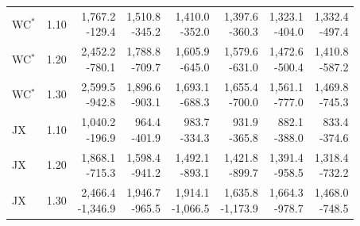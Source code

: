 \begin{table}[htbp]
\begin{minipage}{.95\textwidth}
\begin{tabular*}{\linewidth}{@{\extracolsep{\fill}}llrrrrrr@{}}
WC$^{*}$ & 1.10 & \shortstack{1,767.2\\-129.4} & \shortstack{1,510.8\\-345.2} & \shortstack{1,410.0\\-352.0} & \shortstack{1,397.6\\-360.3} & \shortstack{1,323.1\\-404.0} & \shortstack{1,332.4\\-497.4} \\
WC$^{*}$ & 1.20 & \shortstack{2,452.2\\-780.1} & \shortstack{1,788.8\\-709.7} & \shortstack{1,605.9\\-645.0} & \shortstack{1,579.6\\-631.0} & \shortstack{1,472.6\\-500.4} & \shortstack{1,410.8\\-587.2} \\
WC$^{*}$ & 1.30 & \shortstack{2,599.5\\-942.8} & \shortstack{1,896.6\\-903.1} & \shortstack{1,693.1\\-688.3} & \shortstack{1,655.4\\-700.0} & \shortstack{1,561.1\\-777.0} & \shortstack{1,469.8\\-745.3} \\
JX & 1.10 & \shortstack{1,040.2\\-196.9} & \shortstack{964.4\\-401.9} & \shortstack{983.7\\-334.3} & \shortstack{931.9\\-365.8} & \shortstack{882.1\\-388.0} & \shortstack{833.4\\-374.6} \\
JX & 1.20 & \shortstack{1,868.1\\-715.3} & \shortstack{1,598.4\\-941.2} & \shortstack{1,492.1\\-893.1} & \shortstack{1,421.8\\-899.7} & \shortstack{1,391.4\\-958.5} & \shortstack{1,318.4\\-732.2} \\
JX & 1.30 & \shortstack{2,466.4\\-1,346.9} & \shortstack{1,946.7\\-965.5} & \shortstack{1,914.1\\-1,066.5} & \shortstack{1,635.8\\-1,173.9} & \shortstack{1,664.3\\-978.7} & \shortstack{1,468.0\\-748.5} \\

\end{tabular*}
\end{minipage}
\end{table}
